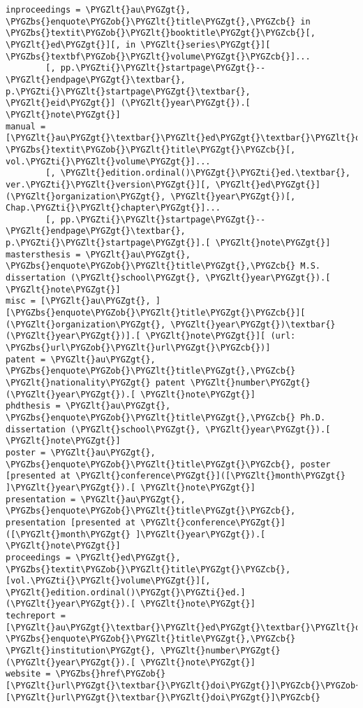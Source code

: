 \documentclass[letterpaper,10pt,english]{sphinxmanual}
\def\PYGZbs{\char`\\}
\def\PYGZob{\char`\{}
\def\PYGZcb{\char`\}}
\def\PYGZlt{\char`\<}
\def\PYGZgt{\char`\>}
\def\PYGZti{\char`\~}
\begin{document}
\begin{Verbatim}[commandchars=\\\{\}]
inproceedings = \PYGZlt{}au\PYGZgt{}, \PYGZbs{}enquote\PYGZob{}\PYGZlt{}title\PYGZgt{},\PYGZcb{} in \PYGZbs{}textit\PYGZob{}\PYGZlt{}booktitle\PYGZgt{}\PYGZcb{}[, \PYGZlt{}ed\PYGZgt{}][, in \PYGZlt{}series\PYGZgt{}][ \PYGZbs{}textbf\PYGZob{}\PYGZlt{}volume\PYGZgt{}\PYGZcb{}]...
        [, pp.\PYGZti{}\PYGZlt{}startpage\PYGZgt{}--\PYGZlt{}endpage\PYGZgt{}\textbar{}, p.\PYGZti{}\PYGZlt{}startpage\PYGZgt{}\textbar{}, \PYGZlt{}eid\PYGZgt{}] (\PYGZlt{}year\PYGZgt{}).[ \PYGZlt{}note\PYGZgt{}]
manual = [\PYGZlt{}au\PYGZgt{}\textbar{}\PYGZlt{}ed\PYGZgt{}\textbar{}\PYGZlt{}organization\PYGZgt{}\textbar{}\PYGZlt{}institution\PYGZgt{}\textbar{}], \PYGZbs{}textit\PYGZob{}\PYGZlt{}title\PYGZgt{}\PYGZcb{}[, vol.\PYGZti{}\PYGZlt{}volume\PYGZgt{}]...
        [, \PYGZlt{}edition.ordinal()\PYGZgt{}\PYGZti{}ed.\textbar{}, ver.\PYGZti{}\PYGZlt{}version\PYGZgt{}][, \PYGZlt{}ed\PYGZgt{}] (\PYGZlt{}organization\PYGZgt{}, \PYGZlt{}year\PYGZgt{})[, Chap.\PYGZti{}\PYGZlt{}chapter\PYGZgt{}]...
        [, pp.\PYGZti{}\PYGZlt{}startpage\PYGZgt{}--\PYGZlt{}endpage\PYGZgt{}\textbar{}, p.\PYGZti{}\PYGZlt{}startpage\PYGZgt{}].[ \PYGZlt{}note\PYGZgt{}]
mastersthesis = \PYGZlt{}au\PYGZgt{}, \PYGZbs{}enquote\PYGZob{}\PYGZlt{}title\PYGZgt{},\PYGZcb{} M.S. dissertation (\PYGZlt{}school\PYGZgt{}, \PYGZlt{}year\PYGZgt{}).[ \PYGZlt{}note\PYGZgt{}]
misc = [\PYGZlt{}au\PYGZgt{}, ][\PYGZbs{}enquote\PYGZob{}\PYGZlt{}title\PYGZgt{}\PYGZcb{}][ (\PYGZlt{}organization\PYGZgt{}, \PYGZlt{}year\PYGZgt{})\textbar{} (\PYGZlt{}year\PYGZgt{})].[ \PYGZlt{}note\PYGZgt{}][ (url: \PYGZbs{}url\PYGZob{}\PYGZlt{}url\PYGZgt{}\PYGZcb{})]
patent = \PYGZlt{}au\PYGZgt{}, \PYGZbs{}enquote\PYGZob{}\PYGZlt{}title\PYGZgt{},\PYGZcb{} \PYGZlt{}nationality\PYGZgt{} patent \PYGZlt{}number\PYGZgt{} (\PYGZlt{}year\PYGZgt{}).[ \PYGZlt{}note\PYGZgt{}]
phdthesis = \PYGZlt{}au\PYGZgt{}, \PYGZbs{}enquote\PYGZob{}\PYGZlt{}title\PYGZgt{},\PYGZcb{} Ph.D. dissertation (\PYGZlt{}school\PYGZgt{}, \PYGZlt{}year\PYGZgt{}).[ \PYGZlt{}note\PYGZgt{}]
poster = \PYGZlt{}au\PYGZgt{}, \PYGZbs{}enquote\PYGZob{}\PYGZlt{}title\PYGZgt{}\PYGZcb{}, poster [presented at \PYGZlt{}conference\PYGZgt{}]([\PYGZlt{}month\PYGZgt{} ]\PYGZlt{}year\PYGZgt{}).[ \PYGZlt{}note\PYGZgt{}]
presentation = \PYGZlt{}au\PYGZgt{}, \PYGZbs{}enquote\PYGZob{}\PYGZlt{}title\PYGZgt{}\PYGZcb{}, presentation [presented at \PYGZlt{}conference\PYGZgt{}]([\PYGZlt{}month\PYGZgt{} ]\PYGZlt{}year\PYGZgt{}).[ \PYGZlt{}note\PYGZgt{}]
proceedings = \PYGZlt{}ed\PYGZgt{}, \PYGZbs{}textit\PYGZob{}\PYGZlt{}title\PYGZgt{}\PYGZcb{}, [vol.\PYGZti{}\PYGZlt{}volume\PYGZgt{}][, \PYGZlt{}edition.ordinal()\PYGZgt{}\PYGZti{}ed.] (\PYGZlt{}year\PYGZgt{}).[ \PYGZlt{}note\PYGZgt{}]
techreport = [\PYGZlt{}au\PYGZgt{}\textbar{}\PYGZlt{}ed\PYGZgt{}\textbar{}\PYGZlt{}organization\PYGZgt{}\textbar{}\PYGZlt{}institution\PYGZgt{}\textbar{}], \PYGZbs{}enquote\PYGZob{}\PYGZlt{}title\PYGZgt{},\PYGZcb{} \PYGZlt{}institution\PYGZgt{}, \PYGZlt{}number\PYGZgt{} (\PYGZlt{}year\PYGZgt{}).[ \PYGZlt{}note\PYGZgt{}]
website = \PYGZbs{}href\PYGZob{}[\PYGZlt{}url\PYGZgt{}\textbar{}\PYGZlt{}doi\PYGZgt{}]\PYGZcb{}\PYGZob{}[\PYGZlt{}url\PYGZgt{}\textbar{}\PYGZlt{}doi\PYGZgt{}]\PYGZcb{}


\end{Verbatim}
\end{document}
